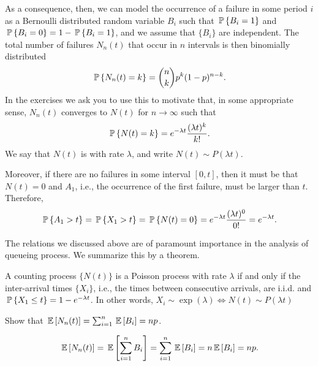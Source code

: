 As a consequence, then, we can model the occurrence of a failure in
some period $i$ as a Bernoulli distributed random variable $B_i$ such
that $\P{B_i =1}$ and $\P{B_i=0} = 1-\P{B_i = 1}$, and we assume that
$\{B_i\}$ are independent. The total number of failures $N_n(t)$ that
occur in $n$ intervals is then binomially distributed
\begin{equation}\label{eq:bin}
  \P{N_n(t) = k} = {n \choose k} p^k (1-p)^{n-k}.
\end{equation}
In the exercises we ask you to use this to motivate that, in some
appropriate sense, $N_n(t)$ converges to $N(t)$ for $n\to \infty$ such
that
\begin{equation}\label{eq:pois}
  \P{N(t) = k} = 
e^{-\lambda t} \frac{(\lambda t)^k}{k!}.
\end{equation}
We say that $N(t)$ is  with rate
$\lambda$, and write $N(t)\sim P(\lambda t)$. 

Moreover, if there are no failures in some interval
$[0,t]$, then it must be that $N(t) = 0$ and $A_1$, i.e., the
occurrence of the first failure, must be larger than $t$.  Therefore,
\begin{equation*}
  \P{A_1>t} = \P{X_1> t} = \P{N(t) = 0} = e^{-\lambda t} \frac{(\lambda t)^0}{0!}= e^{-\lambda t}.
\end{equation*}

The relations we discussed above are of paramount importance in the
analysis of queueing process. We summarize this by a theorem.
\begin{theorem}\label{thr:1}
  A counting process $\{N(t)\}$ is a Poisson process with rate $\lambda$ if and only if
  the inter-arrival times $\{X_i\}$, i.e., the times between consecutive
  arrivals, are i.i.d. and $\P{ X_1\leq t} = 1 - e^{-\lambda t}$. In other words, $X_i\sim \exp(\lambda) \Leftrightarrow N(t) \sim P(\lambda t)$ 
\end{theorem}

\begin{question}
Show that $\E{N_n(t)} = \sum_{i=1}^n \E{B_i} = n p$.
\begin{solution}
  \begin{equation*}
    \E{N_n(t)} = \E{\sum_{i=1}^n {B_i}} = \sum_{i=1}^n \E{B_i} = n \E{B_i} = n p.
  \end{equation*}
\end{solution}
\end{question}

